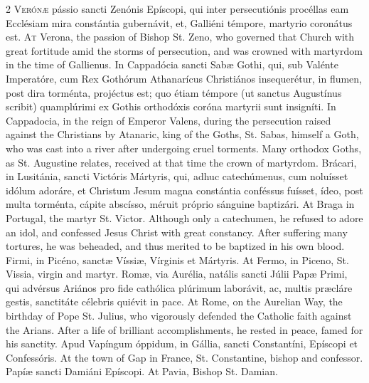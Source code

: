 \begin{paracol}{2}
\lettrine[lines=2]{V}{erónæ} pássio sancti 
 Zenónis Epíscopi, qui inter persecutiónis procéllas eam Ecclésiam mira 
 constántia gubernávit, et, Galliéni témpore, martyrio coronátus est.
\switchcolumn
{}
\lettrine[lines=2]{A}{t} Verona, the passion of Bishop 
 St. Zeno, who governed that Church with great fortitude amid the storms of 
 persecution, and was crowned with martyrdom in the time of Gallienus.
\switchcolumn*
{}
In Cappadócia sancti 
 Sabæ Gothi, qui, sub Valénte Imperatóre, cum Rex Gothórum Athanarícus 
 Christiános insequerétur, in flumen, post dira torménta, projéctus est; quo 
 étiam témpore (ut sanctus Augustínus scribit) quamplúrimi ex Gothis 
 orthodóxis coróna martyrii sunt insigníti.
\switchcolumn
{}
In Cappadocia, in the reign of 
 Emperor Valens, during the persecution raised against the Christians by 
 Atanaric, king of the Goths, St. Sabas, himself a Goth, who was cast into a 
 river after undergoing cruel torments. Many orthodox Goths, as St. 
 Augustine relates, received at that time the crown of martyrdom.
\switchcolumn*
{}
Brácari, in Lusitánia, 
 sancti Victóris Mártyris, qui, adhuc catechúmenus, cum noluísset idólum 
 adoráre, et Christum Jesum magna constántia conféssus fuísset, ídeo, post 
 multa torménta, cápite abscísso, méruit próprio sánguine baptizári.
\switchcolumn
{}
At Braga in Portugal, the martyr 
 St. Victor. Although only a catechumen, he refused to adore an idol, 
 and confessed Jesus Christ with great constancy. After suffering many 
 tortures, he was beheaded, and thus merited to be baptized in his own blood.
\switchcolumn*
{}
Firmi, in Picéno, 
 sanctæ Víssiæ, Vírginis et Mártyris.
\switchcolumn
{}
At Fermo, in Piceno, St. Vissia, 
 virgin and martyr.
\switchcolumn*
{}
Romæ, via Aurélia, natális sancti Júlii Papæ Primi, qui advérsus Ariános pro fide cathólica 
 plúrimum laborávit, ac, multis præcláre gestis, sanctitáte célebris quiévit 
 in pace.
\switchcolumn
{}
At Rome, on the Aurelian Way, the 
 birthday of Pope St. Julius, who vigorously defended the Catholic faith 
 against the Arians. After a life of brilliant accomplishments, he 
 rested in peace, famed for his sanctity.
\switchcolumn*
{}
Apud Vapíngum óppidum, 
 in Gállia, sancti Constantíni, Epíscopi et Confessóris.
\switchcolumn
{}
At the town of Gap in France, St. 
 Constantine, bishop and confessor.
\switchcolumn*
{}
Papíæ sancti Damiáni 
 Epíscopi.
\switchcolumn
{}
At Pavia, Bishop St. Damian.
\switchcolumn*
{}
\end{paracol}



